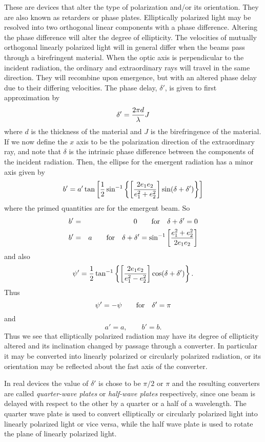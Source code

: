 \documentclass{article}
\newcommand{\bua}{\begin{eqnarray*}}
\newcommand{\eua}{\end{eqnarray*}}
\begin{document}
These are devices that alter the type of polarization and/or its orientation. They are also
known as retarders or phase plates. Elliptically polarized light may be resolved into two
orthogonal linear components with a phase difference. Altering the phase difference
will alter the degree of ellipticity. The velocities of mutually orthogonal linearly polarized light will in general differ when the beams pass through a birefringent material. When the optic axis is perpendicular to the incident radiation, the ordinary and
extraordinary rays will travel in the same direction. They will recombine upon emergence,
but with an altered phase delay due to their differing velocities. The phase delay, $\delta'$, is given to first approximation by 
\[
\delta'={2\pi d\over\lambda}J
\]
\noindent
where $d$ is the thickness of the material and $J$ is the birefringence of the material. If we now define the $x$ axis to be the polarization direction of the extraordinary ray, and note that $\delta$ is the intrinsic phase difference between the components of the incident radiation. Then, the ellipse for the emergent radiation has a minor axis given by
\[
b'=a'\tan\left[{1\over2}\sin^{-1}\left\{\left[{2e_1e_2\over e_1^2+e_2^2}\right]\sin(\delta+\delta')\right\}\right]
\]
\noindent
where the primed quantities are for the emergent beam. So
\bua
b'&=&0 \qquad {\rm for}\quad\delta+\delta'=0 \\
b'&=&a \qquad{\rm for}\quad\delta+\delta'=\sin^{-1}\left[{e_1^2+e_2^2\over 2e_1e_2}\right]
\eua
\noindent
and also
\[
\psi'={1\over 2}\tan^{-1}\left\{\left[{2e_1e_2\over e_1^2-e_2^2}\right]\cos(\delta+\delta')\right\}.
\]
\noindent
Thus
\[
\psi'=-\psi\qquad {\rm for}\quad \delta'=\pi
\]
\noindent
and
\[
a'=a,\qquad b'=b.
\]
Thus we see that elliptically polarized radiation may have its degree of ellipticity altered and its inclination changed by passage through a converter. In particular it may be converted into linearly polarized or circularly polarized radiation, or its orientation may be reflected about the fast axis of the converter. 

In real devices the value of $\delta'$ is chose to be $\pi/2$ or $\pi$ and the resulting converters are called {\it quarter-wave plates} or {\it half-wave plates} respectively,  since one beam is delayed with respect to the other by a quarter or a half of a wavelength.
The quarter wave plate is used to convert elliptically or circularly polarized light into linearly polarized light or vice versa, while the half wave plate is used to rotate the plane of linearly polarized light.
\end{document}

